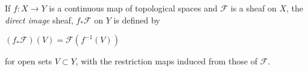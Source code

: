 \documentclass{article}
\begin{document}
If $f : X\to Y$ is a continuous map of topological spaces and $\mathcal{F}$ is a sheaf on $X$,  the {\em direct image} sheaf, $f_*\mathcal{F}$ on $Y$ is defined by

$(f_*\mathcal{F})(V) = \mathcal{F}(f^{-1}(V))$

for open sets $V\subset Y$, with the restriction maps induced from those of $\mathcal{F}$.
\end{document}
